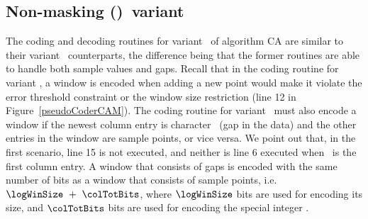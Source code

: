 



\subsection{Non-masking (\NOmaskalgo)\ variant}
\label{algo:ca:nmvariant}


The coding and decoding routines for variant \NOmaskalgo\ of algorithm CA are similar to their variant \maskalgo\ counterparts, the difference being that the former routines are able to handle both sample values and gaps. Recall that in the coding routine for variant \maskalgo, a window is encoded when adding a new point would make it violate the error threshold constraint or the window size restriction (line 12 in Figure~\ref{pseudoCoderCAM}). The coding routine for variant \NOmaskalgo\ must also encode a window if the newest column entry is character \noData\ (gap in the data) and the other entries in the window are sample points, or vice versa. We point out that, in the first scenario, line 15 is not executed, and neither is line 6 executed when \noData\ is the first column entry. A window that consists of gaps is encoded with the same number of bits as a window that consists of sample points, i.e. $\logWinSize\ +\ \colTotBits$, where $\logWinSize$ bits are used for encoding its size, and $\colTotBits$ bits are used for encoding the special integer \nodata. 

